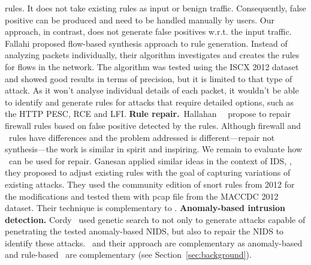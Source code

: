 \documentclass[conference]{IEEEtran}
\begin{document}
rules. It does not take existing rules as input or benign
traffic. Consequently, false positive can be produced and need to be
handled manually by users. Our approach, in contrast, does not
generate false positives w.r.t. the input traffic. Fallahi
\etal{}\cite{fallahi} proposed flow-based synthesis approach to rule
generation. Instead of analyzing packets individually, their algorithm
investigates and creates the rules for flows in the network. The
algorithm was tested using the ISCX 2012 dataset and showed good
results in terms of precision, but it is limited to that type of
attack. As it won't analyse individual details of each packet, it
wouldn't be able to identify and generate rules for attacks that
require detailed options, such as the HTTP PESC, RCE and LFI.
\textbf{Rule repair.}~Hallahan~\etal{}~\cite{8102263} propose to
repair firewall rules based on false positive detected by the
rules. Although firewall and \nids\ rules have differences and the
problem addressed is different---repair not synthesis---the work is
similar in spirit and inspiring. We remain to evaluate how \tname\ can
be used for repair.  Ganesan \etal{}\cite{ganesan} applied similar
ideas in the context of IDS, \ie{}, they proposed to adjust existing
rules with the goal of capturing variations of existing attacks. They
used the community edition of snort rules from 2012 for the
modifications and tested them with pcap file from the MACCDC 2012
dataset. Their technique is complementary to \tname{}.
\textbf{Anomaly-based intrusion detection.}
Cordy~\etal{}\cite{cordy-etal-issta19} used genetic search to not only
to generate attacks capable of penetrating the tested anomaly-based
NIDS, but also to repair the NIDS to identify these
attacks. \tname\ and their approach are complementary as anomaly-based
and rule-based \nids\ are complementary (see
Section~\ref{sec:background}).


\noindent

\end{document}
